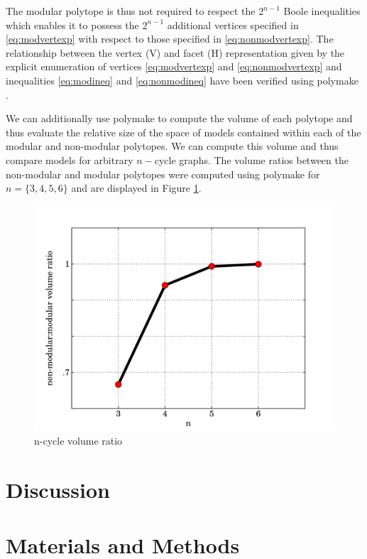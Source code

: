 \documentclass[10pt]{article}
\begin{document}
The modular polytope is thus not required to respect the $2^{n-1}$ Boole inequalities which enables it to possess the $2^{n-1}$ additional vertices specified in \ref{eq:modvertexp} with respect to those specified in \ref{eq:nonmodvertexp}. The relationship between the vertex (V) and facet (H) representation given by the explicit enumeration of vertices \ref{eq:modvertexp} and \ref{eq:nonmodvertexp} and inequalities \ref{eq:modineq} and \ref{eq:nonmodineq} have been verified using polymake \cite{GawrilowEwgenijD-TJoswig2000}.

We can additionally use polymake to compute the volume of each polytope and thus evaluate the relative size of the space of models contained within each of the modular and non-modular polytopes. We can compute this volume and thus compare models for arbitrary $n-$cycle graphs. The volume ratios between the non-modular and modular polytopes were computed using polymake for $n=\{3,4,5,6\}$ and are displayed in Figure \ref{fig:ncycvolrat}.

\begin{figure}
\begin{center}
\noindent\includegraphics[width=0.6\columnwidth]{fig/ncycvolrat.pdf}
\end{center}
\caption{n-cycle volume ratio}
\label{fig:ncycvolrat}
\end{figure}


\section*{Discussion}

\section*{Materials and Methods}
\end{document}
